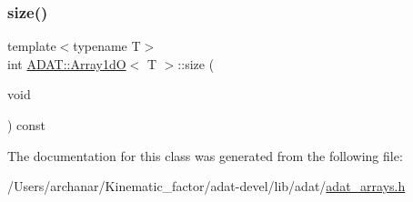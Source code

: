\subsubsection{\texorpdfstring{size()}{size()}\hspace{0.1cm}{\footnotesize\ttfamily [3/3]}}
{\footnotesize\ttfamily template$<$typename T$>$ \\
int \mbox{\hyperlink{classADAT_1_1Array1dO}{A\+D\+A\+T\+::\+Array1dO}}$<$ T $>$\+::size (\begin{DoxyParamCaption}\item[{void}]{ }\end{DoxyParamCaption}) const\hspace{0.3cm}{\ttfamily [inline]}}



The documentation for this class was generated from the following file\+:\begin{DoxyCompactItemize}
\item 
/\+Users/archanar/\+Kinematic\+\_\+factor/adat-\/devel/lib/adat/\mbox{\hyperlink{adat-devel_2lib_2adat_2adat__arrays_8h}{adat\+\_\+arrays.\+h}}\end{DoxyCompactItemize}
